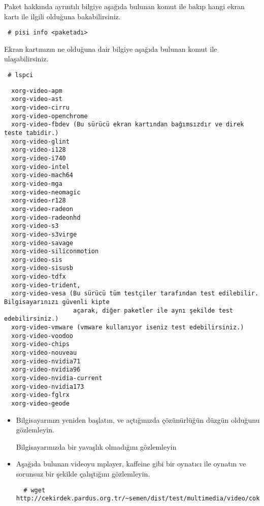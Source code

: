 \documentclass[a4paper,10pt]{article}
\begin{document}
\begin{enumerate}
Paket hakkında ayrıntılı bilgiye aşağıda bulunan komut ile bakıp hangi ekran kartı ile ilgili olduğuna bakabilirsiniz.
\begin{verbatim}
 # pisi info <paketadı>
\end{verbatim}

Ekran kartınızın ne olduğuna dair bilgiye aşağıda bulunan komut ile ulaşabilirsiniz.
\begin{verbatim}
 # lspci
\end{verbatim}

\begin{verbatim}
  xorg-video-apm 
  xorg-video-ast
  xorg-video-cirru
  xorg-video-openchrome
  xorg-video-fbdev (Bu sürücü ekran kartından bağımsızdır ve direk teste tabidir.)
  xorg-video-glint
  xorg-video-i128
  xorg-video-i740
  xorg-video-intel
  xorg-video-mach64
  xorg-video-mga
  xorg-video-neomagic
  xorg-video-r128
  xorg-video-radeon
  xorg-video-radeonhd
  xorg-video-s3
  xorg-video-s3virge
  xorg-video-savage
  xorg-video-siliconmotion
  xorg-video-sis
  xorg-video-sisusb
  xorg-video-tdfx
  xorg-video-trident,
  xorg-video-vesa (Bu sürücü tüm testçiler tarafından test edilebilir. Bilgisayarınızı güvenli kipte
                   açarak, diğer paketler ile aynı şekilde test edebilirsiniz.)
  xorg-video-vmware (vmware kullanıyor iseniz test edebilirsiniz.)
  xorg-video-voodoo
  xorg-video-chips
  xorg-video-nouveau
  xorg-video-nvidia71
  xorg-video-nvidia96
  xorg-video-nvidia-current
  xorg-video-nvidia173
  xorg-video-fglrx
  xorg-video-geode
\end{verbatim}

\begin{itemize}
  \item Bilgisayarınızı yeniden başlatın, ve açtığınızda çözünürlüğün düzgün olduğunu gözlemleyin.

  Bilgisayarınızda bir yavaşlık olmadığını gözlemleyin
  \item Aşağıda bulunan videoyu mplayer, kaffeine gibi bir oynatıcı ile oynatın ve sorunsuz bir şekilde çalıştığını gözlemleyin.
  \begin{verbatim}
  # wget http://cekirdek.pardus.org.tr/~semen/dist/test/multimedia/video/cokluortam/DVD.mpg
  \end{verbatim}
\end{itemize}

\end{enumerate}
\end{document}
